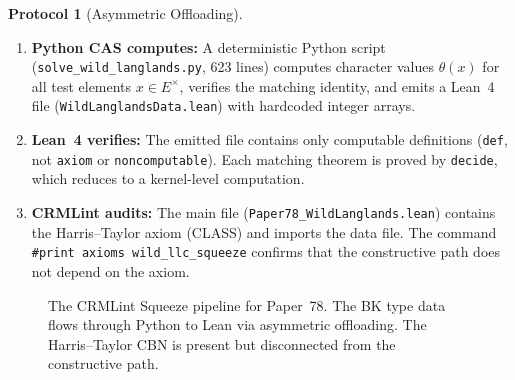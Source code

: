 \documentclass[11pt]{article}
\theoremstyle{plain}
\theoremstyle{definition}
\newtheorem{protocol}[theorem]{Protocol}
\theoremstyle{remark}
\newcommand{\BISH}{\mathsf{BISH}}
\newcommand{\CLASS}{\mathsf{CLASS}}
\begin{document}
\begin{protocol}[Asymmetric Offloading]\label{prot:ao}
\begin{enumerate}[nosep]
\item \textbf{Python CAS computes:} A deterministic Python
  script (\texttt{solve\_wild\_langlands.py}, 623 lines)
  computes character values $\theta(x)$ for all test
  elements $x \in E^\times$, verifies the matching identity,
  and emits a Lean~4 file
  (\texttt{WildLanglandsData.lean}) with hardcoded integer
  arrays.
\item \textbf{Lean~4 verifies:} The emitted file contains
  only computable definitions (\texttt{def}, not
  \texttt{axiom} or \texttt{noncomputable}).  Each matching
  theorem is proved by \texttt{decide}, which reduces to a
  kernel-level computation.
\item \textbf{CRMLint audits:} The main file
  (\texttt{Paper78\_WildLanglands.lean}) contains the
  Harris--Taylor axiom (CLASS) and imports the data file.
  The command \texttt{\#print axioms wild\_llc\_squeeze}
  confirms that the constructive path does not depend on
  the axiom.
\end{enumerate}
\end{protocol}

\begin{figure}[ht]
\centering
{}
\caption{The CRMLint Squeeze pipeline for Paper~78.
  The BK type data flows through Python to Lean via
  asymmetric offloading.  The Harris--Taylor CBN is
  present but disconnected from the constructive path.}
\label{fig:pipeline}
\end{figure}
\end{document}
